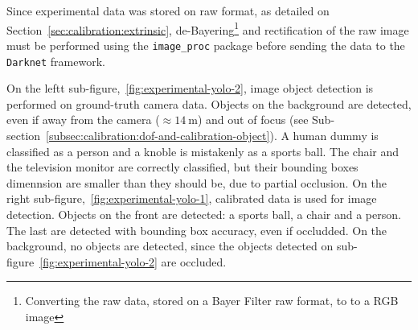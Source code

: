 Since experimental data was stored on raw format, as detailed on Section~\ref{sec:calibration:extrinsic}, de-Bayering\footnote{Converting the raw data, stored on a Bayer Filter raw format, to  to a RGB image} and rectification of the raw image must be performed using the \texttt{image\_proc} package before sending the data to the \texttt{Darknet} framework.

On the leftt sub-figure,~\ref{fig:experimental-yolo-2}, image object detection is performed on ground-truth camera data. Objects on the background are detected, even if away from the camera ($\approx\SI{14}{\meter}$) and out of focus (see Sub-section~\ref{subsec:calibration:dof-and-calibration-object}). A human dummy is classified as a person and a knoble is mistakenly as a sports ball. The chair and the television monitor are correctly classified, but their bounding boxes dimennsion are smaller than they should be, due to partial occlusion.
On the right sub-figure,~\ref{fig:experimental-yolo-1}, calibrated data is used for image detection. Objects on the front are detected: a sports ball, a chair and a person. The last are detected with bounding box accuracy, even if occludded. On the background, no objects are detected, since the objects detected on sub-figure~\ref{fig:experimental-yolo-2} are occluded. 

